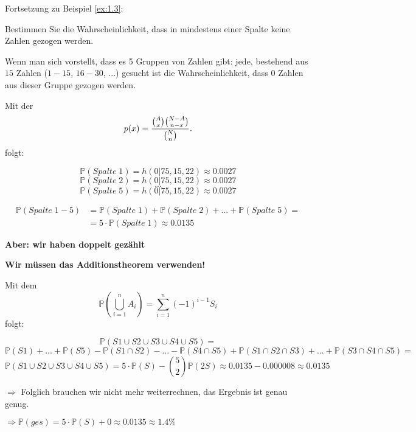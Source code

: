 \begin{uebsp}
\begin{Exercise}[label=ex:1.4]
Fortsetzung zu Beispiel \ref{ex:1.3}:

Bestimmen Sie die Wahrscheinlichkeit, dass in mindestens einer Spalte keine Zahlen gezogen werden.
\end{Exercise}
\begin{Answer}
Wenn man sich vorstellt, dass es 5 Gruppen von Zahlen gibt: jede, bestehend aus $15$ Zahlen ($1-15$, $16-30$, ...) gesucht ist die Wahrscheinlichkeit, dass $0$ Zahlen aus dieser Gruppe gezogen werden. 

\begin{uebsp_theory}
    Mit der  
    \[p(x)={{A\choose x}{N-A\choose n-x}\over {N\choose n}}.\]
    folgt:
\end{uebsp_theory}

\[\mathbb{P}(Spalte\;1)=h(0|75,15,22)\approx 0.0027\]
\[\mathbb{P}(Spalte\;2)=h(0|75,15,22)\approx 0.0027\]
\[...\]
\[\mathbb{P}(Spalte\;5)=h(0|75,15,22)\approx 0.0027\]

\begin{align*}\mathbb{P}(Spalte\;1-5)&=\mathbb{P}(Spalte\;1)+\mathbb{P}(Spalte\;2)+...+\mathbb{P}(Spalte\;5)=\\
        &=5\cdot \mathbb{P}(Spalte\;1)\approx 0.0135\end{align*}

\textbf{Aber: wir haben doppelt gezählt}

\textbf{Wir müssen das Additionstheorem verwenden!}\\

\begin{uebsp_theory}
    Mit dem   
    \[\mathbb P(\bigcup_{i=1}^n A_i)=\sum_{i=1}^n(-1)^{i-1}S_i\]
     folgt:
\end{uebsp_theory}

\[\mathbb{P}(S1\cup S2\cup S3\cup S4\cup S5)=\]
\[\mathbb{P}(S1)+...+\mathbb{P}(S5)-\mathbb{P}(S1\cap S2)-...-\mathbb{P}(S4\cap S5)+\mathbb{P}(S1\cap S2\cap S3)+...+\mathbb{P}(S3\cap S4\cap S5)=\]
\[\mathbb{P}(S1\cup S2\cup S3\cup S4\cup S5)=5\cdot \mathbb{P}(S)-\binom{5}{2}\mathbb{P}(2S)\approx 0.0135-0.000008\approx 0.0135\]

$\Rightarrow$ Folglich brauchen wir nicht mehr weiterrechnen, das Ergebnis ist genau genug.

$\Rightarrow \mathbb{P}(ges)=5\cdot \mathbb{P}(S)+0\approx 0.0135\approx 1.4\%$

\end{Answer}
\end{uebsp}

